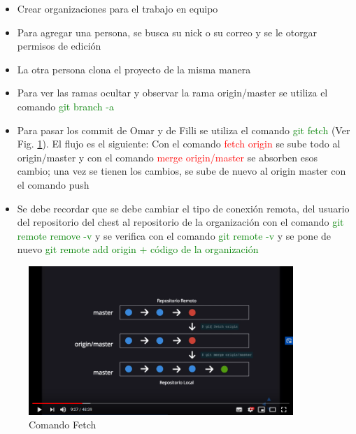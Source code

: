 \documentclass{article}
\begin{document}
		\begin{itemize}
		\item Crear organizaciones para el trabajo en equipo
		\item Para agregar una persona, se busca su nick o su correo y se le otorgar permisos de edición
		\item La otra persona clona el proyecto de la misma manera
		\item Para ver las ramas ocultar y observar la rama origin/master se utiliza el comando \textcolor{green}{git branch -a}
		\item Para pasar los commit de Omar y de Filli se utiliza el comando \textcolor{green}{git fetch} (Ver Fig. \ref{fetch}). El flujo es el siguiente: Con el comando \textcolor{red}{fetch origin} se sube todo al origin/master y con el comando  \textcolor{red}{merge origin/master} se absorben esos cambio; una vez se tienen los cambios, se sube de nuevo al origin master con el comando push
		\item Se debe recordar que se debe cambiar el tipo de conexión remota, del usuario del repositorio del chest al repositorio de la organización con el comando \textcolor{green}{git remote remove -v} y se verifica con el comando \textcolor{green}{git remote -v} y se pone de nuevo \textcolor{green}{git remote add origin $+$ código de la organización}
		
	\end{itemize}

	\begin{figure}[t!]
		\centering
		\includegraphics[width = 100mm]{imagenes/fetch2}
		\caption{Comando Fetch}
		\label{fetch}
	\end{figure}
\end{document}
